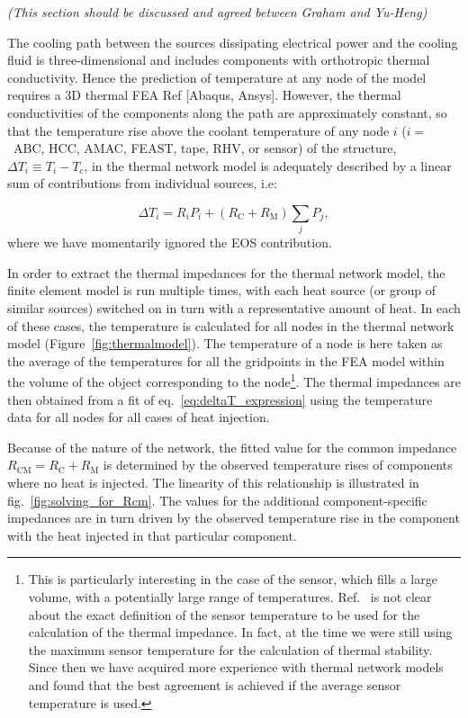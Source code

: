 \textit{(This section should be discussed and agreed between Graham and Yu-Heng)}

The cooling path between the sources dissipating electrical power and the cooling fluid is three-dimensional and includes components with orthotropic thermal conductivity. Hence the prediction of temperature at any node of the model requires a 3D thermal FEA Ref [Abaqus, Ansys]. However, the thermal conductivities of the components along the path are approximately constant, so that the temperature rise above the coolant temperature of any node $i$ ($i=$~ABC, HCC, AMAC, FEAST, tape, RHV, or sensor) of the structure, \mbox{$\Delta T_i \equiv T_i - T_c$,} in the thermal network model is adequately described by a linear sum of contributions from individual sources, i.e:

\begin{equation}
\Delta T_i = R_i P_i + \left(R_\text{C} + R_\text{M}\right)\sum_j P_j, 
\label{eq:deltaT_expression}
\end{equation}
where we have momentarily ignored the EOS contribution.

In order to extract the thermal impedances for the thermal network model, the finite element model is run multiple times, with each heat source (or group of similar sources) switched on in turn with a representative amount of heat. In each of these cases, the temperature is calculated for all nodes in the thermal network model (Figure~\ref{fig:thermalmodel}). The temperature of a node is here taken as the average of the temperatures for all the gridpoints in the FEA model within the volume of the object corresponding to the node\footnote{This is particularly interesting in the case of the sensor, which fills a large volume, with a potentially large range of temperatures. Ref.~\cite{Beck:2010zzd} is not clear about the exact definition of the sensor temperature to be used for the calculation of the thermal impedance. In fact, at the time we were still using the maximum sensor temperature for the calculation of thermal stability. Since then we have acquired more experience with thermal network models and found that the best agreement is achieved if the average sensor temperature is used.}. The thermal impedances are then obtained from a fit of eq.~\ref{eq:deltaT_expression} using the temperature data for all nodes for all cases of heat injection.

Because of the nature of the network, the fitted value for the common impedance $R_\text{CM}=R_\text{C} + R_\text{M}$ is determined by the observed temperature rises of components where no heat is injected. The linearity of this relationship is illustrated in fig.~\ref{fig:solving_for_Rcm}. The values for the additional component-specific impedances are in turn driven by the observed temperature rise in the component with the heat injected in that particular component.



